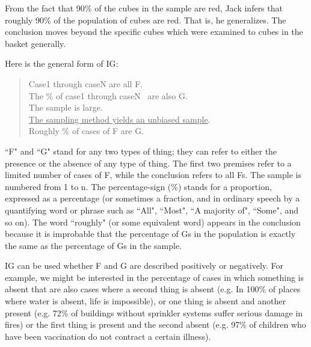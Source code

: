 From the fact that 90\% 
of the cubes in the sample are red, Jack infers that roughly 90\% 
of the population of cubes are red. That is, he generalizes. The conclusion moves beyond the specific cubes which were examined to 
cubes in the basket generally. 

Here is the general form of IG: 

\begin{quote}
Case1 through caseN are all F. \\
The \% of case1 through caseN  are also G. \\
The sample is large. \\
\underline{The sampling method yields an unbiased sample}. \\
Roughly \% of cases of F are G. \\
\end{quote}

``F" and ``G" stand for any two types of thing; they can refer to either the presence or the absence of any type of thing. The first two 
premises refer to a limited number of cases of F, while the conclusion refers to all Fs. The sample is numbered from 1 to n. The 
percentage-sign (\%) 
stands for a proportion, expressed as a percentage (or sometimes a fraction, and in ordinary speech by a quantifying 
word or phrase such as ``All", ``Most", ``A majority of", ``Some", and so on). The word ``roughly" (or some equivalent word) appears in the 
conclusion because it is improbable that the percentage of Gs in the population is exactly the same as the percentage of Gs in the sample.

IG can be used whether F and G are described positively or negatively. For example, we might be interested in the percentage of cases in 
which something is absent that are also cases where a second thing is absent (e.g. In 100\% 
of places where water is absent, life is 
impossible), or one thing is absent and another present (e.g. 72\% 
of buildings without sprinkler systems suffer serious damage in fires) or 
the first thing is present and the second absent (e.g. 97\% 
of children who have been vaccination do not contract a certain illness).

